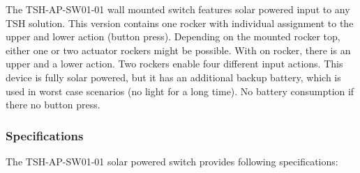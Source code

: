 \documentclass[]{scrreprt}%
\begin{document}
The TSH-AP-SW01-01 wall mounted switch features solar powered input to any TSH solution. This version contains one rocker with individual assignment to the upper and lower action (button press).
Depending on the mounted rocker top, either one or two actuator rockers might be possible. With on rocker, there is an upper and a lower action. Two rockers enable four different input actions.
This device is fully solar powered, but it has an additional backup battery, which is used in worst case scenarios (no light for a long time). No battery consumption if there no button press.

\newpage
\subsubsection{Specifications}

The TSH-AP-SW01-01 solar powered switch provides following specifications:
\end{document}

